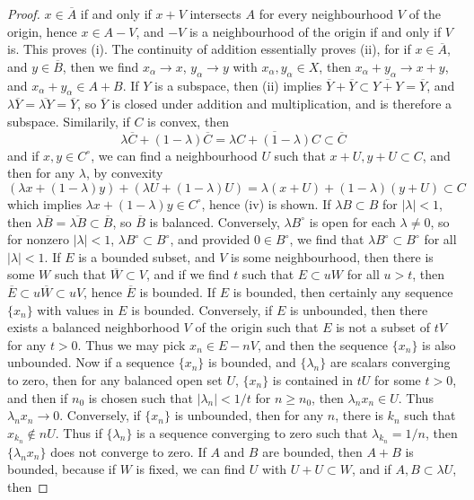 \begin{proof}
    $x \in \overline{A}$ if and only if $x + V$ intersects $A$ for every neighbourhood $V$ of the origin, hence $x \in A - V$, and $-V$ is a neighbourhood of the origin if and only if $V$ is. This proves (i). The continuity of addition essentially proves (ii), for if $x \in \overline{A}$, and $y \in \overline{B}$, then we find $x_\alpha \to x$, $y_\alpha \to y$ with $x_\alpha, y_\alpha \in X$, then $x_\alpha + y_\alpha \to x + y$, and $x_\alpha + y_\alpha \in A + B$. If $Y$ is a subspace, then (ii) implies $\overline{Y} + \overline{Y} \subset \overline{Y + Y} = \overline{Y}$, and $\lambda \overline{Y} = \overline{\lambda Y} = \overline{Y}$, so $\overline{Y}$ is closed under addition and multiplication, and is therefore a subspace. Similarily, if $C$ is convex, then
    \[ \lambda \overline{C} + (1 - \lambda) \overline{C} = \overline{\lambda C + (1 - \lambda) C} \subset \overline{C} \]
    and if $x,y \in C^\circ$, we can find a neighbourhood $U$ such that $x + U, y + U \subset C$, and then for any $\lambda$, by convexity
    \[ (\lambda x + (1 - \lambda) y) + (\lambda U + (1 - \lambda) U) = \lambda(x + U) + (1 - \lambda)(y + U) \subset C \]
    which implies $\lambda x + (1 - \lambda) y \in C^\circ$, hence (iv) is shown. If $\lambda B \subset B$ for $|\lambda| < 1$, then $\lambda \overline{B} = \overline{\lambda B} \subset \overline{B}$, so $\overline{B}$ is balanced. Conversely, $\lambda B^\circ$ is open for each $\lambda \neq 0$, so for nonzero $|\lambda| < 1$, $\lambda B^\circ \subset B^\circ$, and provided $0 \in B^\circ$, we find that $\lambda B^\circ \subset B^\circ$ for all $|\lambda| < 1$. If $E$ is a bounded subset, and $V$ is some neighbourhood, then there is some $W$ such that $\overline{W} \subset V$, and if we find $t$ such that $E \subset uW$ for all $u > t$, then $\overline{E} \subset u\overline{W} \subset uV$, hence $\overline{E}$ is bounded. If $E$ is bounded, then certainly any sequence $\{ x_n \}$ with values in $E$ is bounded. Conversely, if $E$ is unbounded, then there exists a balanced neighborhood $V$ of the origin such that $E$ is not a subset of $tV$ for any $t > 0$. Thus we may pick $x_n \in E - nV$, and then the sequence $\{ x_n \}$ is also unbounded. Now if a sequence $\{ x_n \}$ is bounded, and $\{ \lambda_n \}$ are scalars converging to zero, then for any balanced open set $U$, $\{ x_n \}$ is contained in $tU$ for some $t > 0$, and then if $n_0$ is chosen such that $|\lambda_n| < 1/t$ for $n \geq n_0$, then $\lambda_n x_n \in U$. Thus $\lambda_n x_n \to 0$. Conversely, if $\{ x_n \}$ is unbounded, then for any $n$, there is $k_n$ such that $x_{k_n} \not \in n U$. Thus if $\{ \lambda_n \}$ is a sequence converging to zero such that $\lambda_{k_n} = 1/n$, then $\{ \lambda_n x_n \}$ does not converge to zero. If $A$ and $B$ are bounded, then $A + B$ is bounded, because if $W$ is fixed, we can find $U$ with $U + U \subset W$, and if $A,B \subset \lambda U$, then

\end{proof}
